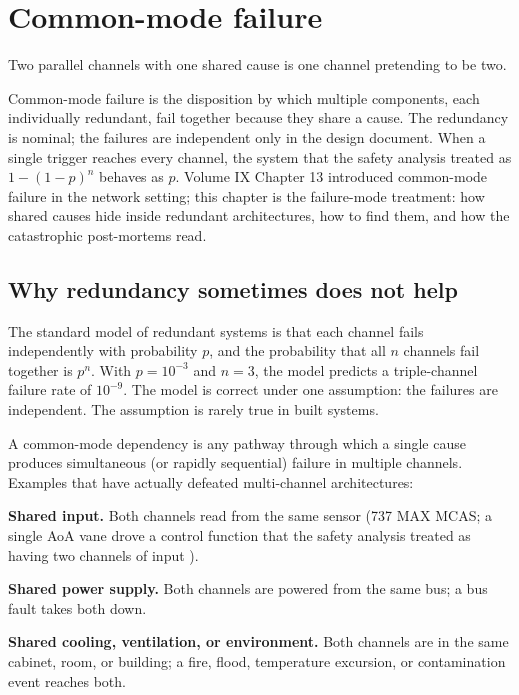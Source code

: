 \chapter{Common-mode failure}
\label{vol10:ch08}

\epigraph{Two parallel channels with one shared cause is one channel pretending to be two.}{}


\noindent
Common-mode failure is the disposition by which multiple components, each individually redundant, fail together because they share a cause. The redundancy is nominal; the failures are independent only in the design document. When a single trigger reaches every channel, the system that the safety analysis treated as $1 - (1 - p)^n$ behaves as $p$. Volume IX Chapter 13 introduced common-mode failure in the network setting; this chapter is the failure-mode treatment: how shared causes hide inside redundant architectures, how to find them, and how the catastrophic post-mortems read.

\section{Why redundancy sometimes does not help}

The standard model of redundant systems is that each channel fails independently with probability $p$, and the probability that all $n$ channels fail together is $p^n$. With $p = 10^{-3}$ and $n = 3$, the model predicts a triple-channel failure rate of $10^{-9}$. The model is correct under one assumption: the failures are independent. The assumption is rarely true in built systems.

A common-mode dependency is any pathway through which a single cause produces simultaneous (or rapidly sequential) failure in multiple channels. Examples that have actually defeated multi-channel architectures:

\textbf{Shared input.} Both channels read from the same sensor (737 MAX MCAS; a single AoA vane drove a control function that the safety analysis treated as having two channels of input \cite{acc:house-737max-2020}).

\textbf{Shared power supply.} Both channels are powered from the same bus; a bus fault takes both down.

\textbf{Shared cooling, ventilation, or environment.} Both channels are in the same cabinet, room, or building; a fire, flood, temperature excursion, or contamination event reaches both.

